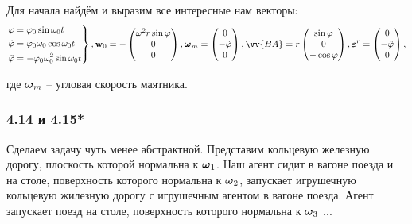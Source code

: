 Для начала найдём и выразим все интересные нам векторы:
$$
    \left.\begin{aligned}
        \varphi         &= \varphi_0 \sin \omega_0 t            \\
        \dot{\varphi}   &= \varphi_0 \omega_0 \cos \omega_0 t   \\
        \ddot{\varphi}  &= - \varphi_0 \omega_0^2 \sin \omega_0 t \\
    \end{aligned}\right\},
    \vc{\mathrm{w}}_0 = - \begin{pmatrix}
        \omega^2 r \sin \varphi \\ 0 \\ 0
    \end{pmatrix},
    \vc{\omega}_m = \begin{pmatrix}
        0 \\ - \dot{\varphi} \\ 0
    \end{pmatrix},
    \vv{BA} = r \begin{pmatrix}
        \sin \varphi \\ 0 \\ - \cos \varphi
    \end{pmatrix},
    \vc{\varepsilon}^r = \begin{pmatrix}
        0 \\ -\ddot{\varphi} \\ 0
    \end{pmatrix},
$$


\noindent
где $\mbox{\boldmath $\omega$}_m$ -- угловая скорость маятника.






\subsubsection*{4.14 и 4.15*}

Сделаем задачу чуть менее абстрактной. Представим кольцевую железную дорогу, плоскость которой нормальна к $\mbox{\boldmath $\omega$}_1$. Наш агент   сидит в вагоне поезда и на столе, поверхность которого нормальна к $\mbox{\boldmath $\omega$}_2$, запускает игрушечную кольцевую жилезную дорогу с игрушечным агентом   в вагоне поезда. Агент   запускает поезд на столе, поверхность которого нормальна к $\mbox{\boldmath $\omega$}_3$ ...

